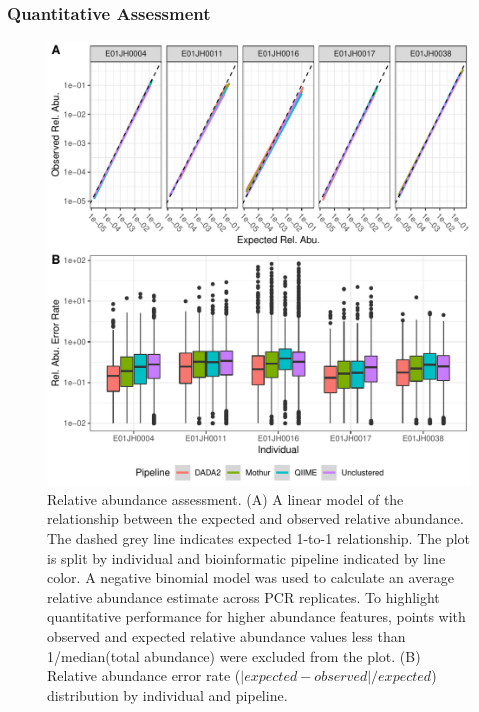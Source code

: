 \documentclass{bmcart}
\begin{document}
\subsubsection*{Quantitative Assessment}

\begin{figure}
\centering
\includegraphics{relAbuError-1.pdf}
\caption{\label{fig:relAbuError}Relative abundance assessment.
(A) A linear model of the relationship between the expected and observed relative
abundance. The dashed grey line indicates expected 1-to-1 relationship.
The plot is split by individual and bioinformatic pipeline indicated by
line color. A negative binomial model was used to
calculate an average relative abundance estimate across PCR
replicates. To highlight quantitative performance for higher abundance features,
points with observed and expected relative abundance values less
than 1/median(total abundance) were excluded from the plot.
(B) Relative abundance error rate (\(|expected - observed|/expected\))
distribution by individual and pipeline.}
\end{figure}
\end{document}
